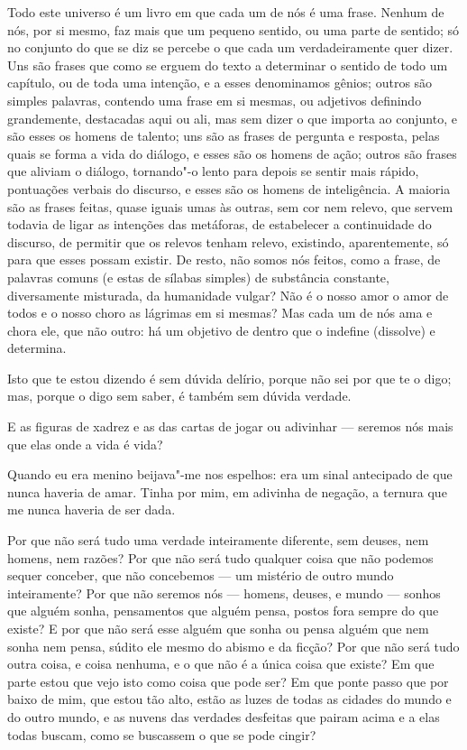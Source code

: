  Todo este universo é um livro em que cada um de nós é
uma frase. Nenhum de nós, por si mesmo, faz mais que um pequeno
sentido, ou uma parte de sentido; só no conjunto do que se diz se
percebe o que cada um verdadeiramente quer dizer. Uns são frases que
como se erguem do texto a determinar o sentido de todo um capítulo,
ou de toda uma intenção, e a esses denominamos gênios; outros são
simples palavras, contendo uma frase em si mesmas, ou adjetivos
definindo grandemente, destacadas aqui ou ali, mas sem dizer o que
importa ao conjunto, e são esses os homens de talento; uns são as
frases de pergunta e resposta, pelas quais se forma a vida do
diálogo, e esses são os homens de ação; outros são frases que aliviam
o diálogo, tornando"-o lento para depois se sentir mais rápido,
pontuações verbais do discurso, e esses são os homens de
inteligência. A maioria são as frases feitas, quase iguais umas às
outras, sem cor nem relevo, que servem todavia de ligar as intenções
das metáforas, de estabelecer a continuidade do discurso, de permitir
que os relevos tenham relevo, existindo, aparentemente, só para que
esses possam existir. De resto, não somos nós feitos, como a frase,
de palavras comuns (e estas de sílabas simples) de substância
constante, diversamente misturada, da humanidade vulgar? Não é o
nosso amor o amor de todos e o nosso choro as lágrimas em si mesmas?
Mas cada um de nós ama e chora ele, que não outro: há um objetivo de
dentro que o indefine (dissolve) e determina.

Isto que te estou dizendo é sem dúvida delírio, porque não sei por que
te o digo; mas, porque o digo sem saber, é também sem dúvida verdade.

E as figuras de xadrez e as das cartas de jogar ou adivinhar --- seremos
nós mais que elas onde a vida é vida?

Quando eu era menino beijava"-me nos espelhos: era um sinal antecipado
de que nunca haveria de amar. Tinha por mim, em adivinha de negação,
a ternura que me nunca haveria de ser dada.

Por que não será tudo uma verdade inteiramente diferente, sem deuses,
nem homens, nem razões? Por que não será tudo qualquer coisa que não
podemos sequer conceber, que não concebemos --- um mistério de outro
mundo inteiramente? Por que não seremos nós --- homens, deuses, e mundo
--- sonhos que alguém sonha, pensamentos que alguém pensa, postos fora
sempre do que existe? E por que não será esse alguém que sonha ou
pensa alguém que nem sonha nem pensa, súdito ele mesmo do abismo e
da ficção? Por que não será tudo outra coisa, e coisa nenhuma, e o
que não é a única coisa que existe? Em que parte estou que vejo isto
como coisa que pode ser? Em que ponte passo que por baixo de mim, que
estou tão alto, estão as luzes de todas as cidades do mundo e do
outro mundo, e as nuvens das verdades desfeitas que pairam acima e a
elas todas buscam, como se buscassem o que se pode cingir?

